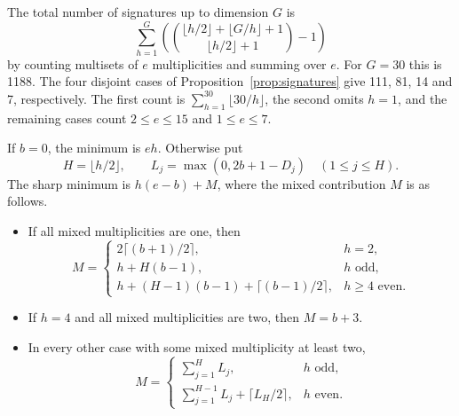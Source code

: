 The total number of signatures up to dimension \(G\) is
\[
 \sum_{h=1}^G
 \left(\binom{\lfloor h/2\rfloor+\lfloor G/h\rfloor+1}
                    {\lfloor h/2\rfloor+1}-1\right)
\]
by counting multisets of \(e\) multiplicities and summing over \(e\).
For \(G=30\) this is 1188. The four disjoint cases of
Proposition~\ref{prop:signatures} give 111, 81, 14 and 7,
respectively. The first count is
\(\sum_{h=1}^{30}\lfloor30/h\rfloor\), the second omits \(h=1\),
and the remaining cases count \(2\le e\le15\) and \(1\le e\le7\).

\begin{theorem}\label{thm:sharp-prank}
If \(b=0\), the minimum is \(eh\). Otherwise put
\[
 H=\lfloor h/2\rfloor,\qquad L_j=\max(0,2b+1-D_j)
 \quad (1\le j\le H).
\]
The sharp minimum is \(h(e-b)+M\), where the mixed contribution
\(M\) is as follows.
\begin{itemize}
\item If all mixed multiplicities are one, then
\[
 M=\begin{cases}
  2\lceil(b+1)/2\rceil, & h=2,\\
  h+H(b-1), & h\text{ odd},\\
  h+(H-1)(b-1)+\lceil(b-1)/2\rceil, & h\ge4\text{ even}.
 \end{cases}
\]
\item If \(h=4\) and all mixed multiplicities are two, then \(M=b+3\).
\item In every other case with some mixed multiplicity at least two,
\[
 M=\begin{cases}
  \displaystyle\sum_{j=1}^H L_j, & h\text{ odd},\\
  \displaystyle\sum_{j=1}^{H-1}L_j+\lceil L_H/2\rceil,
      & h\text{ even}.
 \end{cases}
\]
\end{itemize}
\end{theorem}


